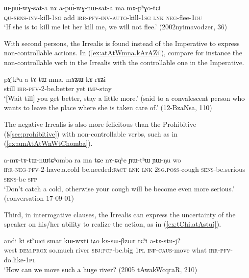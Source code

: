 \begin{exe}
\ex \label{ex:apWGnWsata}
\gll ɯ-ɲɯ́-wɣ-sat-a nɤ a-pɯ́-wɣ-nɯ-sat-a ma mɤ-pʰɣo-tɕi \\
\textsc{qu}-\textsc{sens}-\textsc{inv}-kill-\textsc{1sg} add \textsc{irr}-\textsc{pfv}-\textsc{inv}-\textsc{auto}-kill-\textsc{1sg} \textsc{lnk} \textsc{neg}-flee-\textsc{1du} \\
\glt `If she is to kill me let her kill me, we will not flee.' (2002nyimavodzer, 36)
\end{exe}

With second persons, the Irrealis is found instead of the Imperative to express non-controllable actions. In (\ref{ex:atAtWmna.kArAZi}), compare for instance the non-controllable verb  in the Irrealis with the controllable one  in the Imperative.

\begin{exe}
\ex \label{ex:atAtWmna.kArAZi}
\gll pɤjkʰu a-tɤ-tɯ-mna, mɤʑɯ kɤ-rɤʑi \\
still \textsc{irr}-\textsc{pfv}-2-be.better yet \textsc{imp}-stay \\
\glt `[Wait till] you get better, stay a little more.' (said to a convalescent person who wants to leave the place where she is taken care of.'  (12-BzaNsa, 110)
\end{exe}

The negative Irrealis is also more felicitous than the Prohibitive (§\ref{sec:prohibitive}) with non-controllable verbs, such as  in (\ref{ex:amAtAtWnWtChomba}).

\begin{exe}
\ex \label{ex:amAtAtWnWtChomba}
\gll a-mɤ-tɤ-tɯ-nɯtɕʰomba ra ma tɕe nɤ-ɕqʰe ɲɯ-tʰɯ ɲɯ-ŋu wo \\
\textsc{irr}-\textsc{neg}-\textsc{pfv}-2-have.a.cold be.needed:\textsc{fact} \textsc{lnk} \textsc{lnk} \textsc{2sg}.\textsc{poss}-cough \textsc{sens}-be.serious \textsc{sens}-be \textsc{sfp} \\
\glt `Don't catch a cold, otherwise your cough will be become even more serious.' (conversation 17-09-01)
\end{exe}

Third, in interrogative clauses, the Irrealis can express the uncertainty of the speaker on his/her ability to realize the action,  as in (\ref{ex:tChi.atAstuj}).

\begin{exe}
\ex \label{ex:tChi.atAstuj}
\gll andi ki stʰɯci smar kɯ-wxti iʑo kɤ-sɯ-βzɯr tɕʰi a-tɤ-stu-j? \\
west \textsc{dem}.\textsc{prox} so.much river \textsc{sbj}:\textsc{pcp}-be.big \textsc{1pl} \textsc{inf}-\textsc{caus}-move what \textsc{irr}-\textsc{pfv}-do.like-\textsc{1pl} \\
\glt `How can we move such a huge river? (2005 tAwakWcqraR, 210)
\end{exe}

